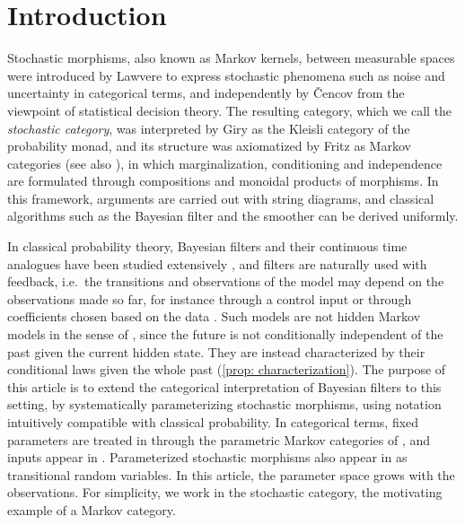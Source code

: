 \documentclass[12pt,reqno]{amsart}%
\theoremstyle{plain}
\theoremstyle{definition}
\begin{document}
%
%
%
\section{Introduction}
%
%
%

Stochastic morphisms, also known as Markov kernels, between measurable spaces
were introduced by Lawvere \cite{La62} to express stochastic phenomena
such as noise and uncertainty in categorical terms,
and independently by \v{C}encov \cite{C65,C82} from the viewpoint of statistical decision theory.
The resulting category, which we call the \emph{stochastic category}, 
was interpreted by Giry \cite{G82} as the Kleisli category of the probability monad,
and its structure was axiomatized by Fritz \cite{F20} as Markov categories (see also \cite{FGPR23}),
in which marginalization, conditioning and independence are formulated through compositions and monoidal products of morphisms.
In this framework, arguments are carried out with string diagrams,
and classical algorithms such as the Bayesian filter \cite{F25,V23} and the smoother \cite{F25} can be derived uniformly.

In classical probability theory, Bayesian filters and their continuous time analogues have been studied extensively
\cite{Kal60,CMR05,BC09,SS23,LS01}, and filters are naturally used with feedback, i.e.\
the transitions and observations of the model may depend on the observations made so far,
for instance through a control input or through coefficients chosen based on the data \cite[\S4.2]{CMR05}.
Such models are not hidden Markov models in the sense of \cite{F25}, since the future is not conditionally independent of the past given the current hidden state.
They are instead characterized by their conditional laws given the whole past (\cref{prop: characterization}).
The purpose of this article is to extend the categorical interpretation of Bayesian filters to this setting,
by systematically parameterizing stochastic morphisms,
using notation intuitively compatible with classical probability.
In categorical terms, fixed parameters are treated in \cite{F25} through the parametric Markov categories
of \cite[\S2.2]{FGPR23}, and inputs appear in \cite[Definition~3.1]{V23}.
Parameterized stochastic morphisms
also appear in \cite{For21} as transitional random variables.
In this article, the parameter space grows with the observations.
For simplicity, we work in the stochastic category, the motivating example of a Markov category.
\end{document}
